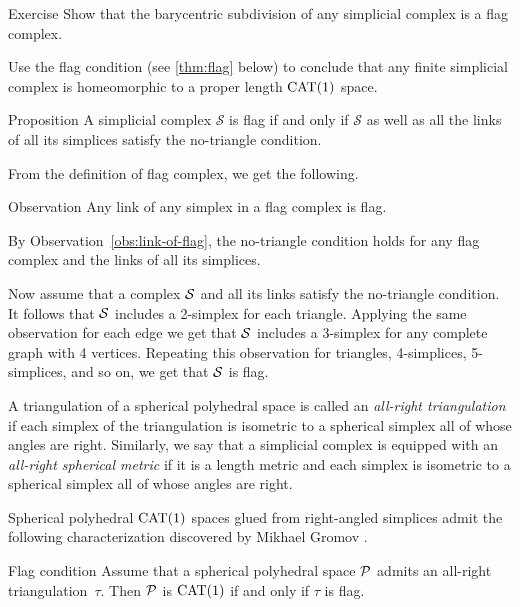 \begin{thm}{Exercise}\label{ex:baricenric-flag}
Show that the barycentric subdivision of any simplicial complex is a flag complex.

Use the flag condition (see \ref{thm:flag} below)
to conclude that any finite simplicial complex is homeomorphic to a proper length $\mathrm{CAT}(1)$ space.

\end{thm}


\begin{thm}{Proposition}\label{prop:no-trig}
A simplicial complex $\mathcal{S}$ is flag if and only if 
$\mathcal{S}$ as well as all the links of all its simplices
satisfy the no-triangle condition.
\end{thm}

From the definition of flag complex, 
we get the following.

\begin{thm}{Observation}\label{obs:link-of-flag}
Any link of any simplex in a flag complex is flag.
\end{thm}


By Observation~\ref{obs:link-of-flag}, the no-triangle condition holds 
for any flag complex and the  links of all its simplices.

Now assume that a complex $\mathcal{S}$ and all its links satisfy 
the no-triangle condition.
It follows that $\mathcal{S}$ includes a 2-simplex for each triangle.
Applying the same observation for each edge we get that $\mathcal{S}$ 
includes a 3-simplex for any complete graph with 4 vertices.
Repeating this observation 
for triangles, 
4-simplices,
5-simplices,
and so on, we get that $\mathcal{S}$ is flag.
\qeds


A triangulation of a spherical polyhedral space 
is called an  \emph{all-right triangulation} 
if each simplex of the triangulation is isometric 
to a spherical simplex all of whose angles are right.
Similarly, we say that a simplicial complex 
is equipped with an  \emph{all-right spherical metric}
if it is a length metric and each simplex is isometric 
to a spherical simplex all of whose angles are right.

Spherical polyhedral $\mathrm{CAT}(1)$ spaces glued from right-angled simplices
admit the following characterization 
discovered by Mikhael Gromov \cite[p.~122]{gromov-1987}.

\begin{thm}{Flag condition}\label{thm:flag}
Assume that a spherical polyhedral space $\mathcal{P}$
admits an all-right triangulation~$\tau$.
Then $\mathcal{P}$ is $\mathrm{CAT}(1)$
if and only if $\tau$ is flag.
\end{thm}


